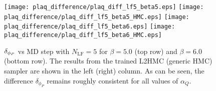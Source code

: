 \documentclass[../main.tex]{subfiles}
\begin{document}
%
%
%
\begin{figure}[htpb]\label{fig:plaq_diff_plots_lf5}
  \texttt{[image: plaq\_difference/plaq\_diff\_lf5\_beta5.eps]}
  \hfill
  \texttt{[image: plaq\_difference/plaq\_diff\_lf5\_beta5\_HMC.eps]}
  \texttt{[image: plaq\_difference/plaq\_diff\_lf5\_beta6.eps]}
  \hfill
  \texttt{[image: plaq\_difference/plaq\_diff\_lf5\_beta6\_HMC.eps]}
  \caption{${\delta_{\phi_{P}}}$ vs MD step with $N_{\mathrm{LF}} = 5$ for $\beta = 5.0$ (top row) and $\beta = 6.0$ (bottom
    row). The results from the trained L2HMC (generic HMC) sampler are shown in the left (right) column. As can be seen,
    the difference $\delta_{\phi_{P}}$ remains roughly consistent for all values of $\alpha_Q$.}
\end{figure}
\end{document}
